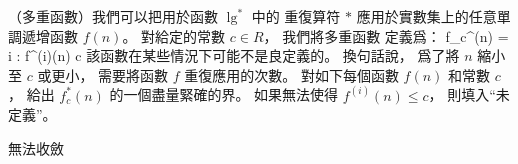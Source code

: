 \startPROBLEM
（多重函數）我們可以把用於函數 $\lg^{\ast}$ 中的
重復算符 $\ast$ 應用於實數集上的任意單調遞增函數 $f(n)$。
對給定的常數 $c \in R$，
我們將多重函數  定義爲：
\startformula
f_c^{\ast}(n) = \min \lbrace i  : f^{(i)}(n) \leq c \rbrace
\stopformula
該函數在某些情況下可能不是良定義的。
換句話說， 爲了將 $n$ 縮小至 $c$ 或更小，
需要將函數 $f$ 重復應用的次數。
對如下每個函數 $f(n)$ 和常數 $c$，
給出 $f_c^{\ast}(n)$ 的一個盡量緊確的界。
如果無法使得 $f^{(i)}(n)\le c$，
則填入“未定義”。

\bTABLE[align=center]
\bTABLEhead
\bTR
	\bTH {} \eTH
	\bTH {} \eTH
	\bTH {} \eTH
\eTR
\eTABLEhead
\bTABLEbody
\bTR
	\bTD {} \eTD
	\bTD {} \eTD
	\bTD\startANSWER {} \stopANSWER\eTD
\eTR
\bTR
	\bTD {} \eTD
	\bTD {} \eTD
	\bTD\startANSWER {} \stopANSWER\eTD
\eTR
\bTR
	\bTD {} \eTD
	\bTD {} \eTD
	\bTD\startANSWER {} \stopANSWER\eTD
\eTR
\bTR
	\bTD {} \eTD
	\bTD {} \eTD
	\bTD\startANSWER {} \stopANSWER\eTD
\eTR
\bTR
	\bTD {} \eTD
	\bTD {} \eTD
	\bTD\startANSWER {} \stopANSWER\eTD
\eTR
\bTR
	\bTD {} \eTD
	\bTD {} \eTD
	\bTD\startANSWER 無法收斂 \stopANSWER\eTD
\eTR
\bTR
	\bTD {} \eTD
	\bTD {} \eTD
	\bTD\startANSWER {} \stopANSWER\eTD
\eTR
\bTR
	\bTD {} \eTD
	\bTD {} \eTD
	\bTD\startANSWER {} \stopANSWER\eTD
\eTR
\eTABLEbody
\eTABLE

\stopPROBLEM
